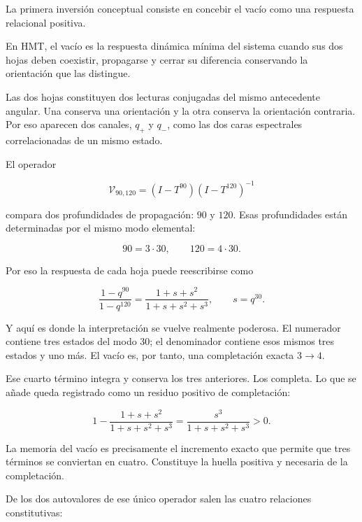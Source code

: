La primera inversión conceptual consiste en concebir el vacío como una respuesta relacional positiva.\par

En HMT, el vacío es la respuesta dinámica mínima del sistema cuando sus dos hojas deben coexistir, propagarse y cerrar su diferencia conservando la orientación que las distingue.\par

Las dos hojas constituyen dos lecturas conjugadas del mismo antecedente angular. Una conserva una orientación y la otra conserva la orientación contraria. Por eso aparecen dos canales, \(q_+\) y \(q_-\), como las dos caras espectrales correlacionadas de un mismo estado.\par

El operador\par

\[
\mathcal V_{90,120}
=
(I-T^{90})(I-T^{120})^{-1}
\]

compara dos profundidades de propagación: \(90\) y \(120\). Esas profundidades están determinadas por el mismo modo elemental:\par

\[
90=3\cdot30,
\qquad
120=4\cdot30.
\]

Por eso la respuesta de cada hoja puede reescribirse como\par

\[
\frac{1-q^{90}}{1-q^{120}}
=
\frac{1+s+s^2}{1+s+s^2+s^3},
\qquad
s=q^{30}.
\]

Y aquí es donde la interpretación se vuelve realmente poderosa. El numerador contiene tres estados del modo \(30\); el denominador contiene esos mismos tres estados y uno más. El vacío es, por tanto, una completación exacta \(3\to4\).\par

Ese cuarto término integra y conserva los tres anteriores. Los completa. Lo que se añade queda registrado como un residuo positivo de completación:\par

\[
1-\frac{1+s+s^2}{1+s+s^2+s^3}
=
\frac{s^3}{1+s+s^2+s^3}>0.
\]

La memoria del vacío es precisamente el incremento exacto que permite que tres términos se conviertan en cuatro. Constituye la huella positiva y necesaria de la completación.\par

De los dos autovalores de ese único operador salen las cuatro relaciones constitutivas:\par

